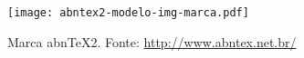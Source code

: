 \begin{frame}

\begin{figure}
  \centering
  \texttt{[image: abntex2-modelo-img-marca.pdf]}
  \caption{Marca abnTeX2. Fonte: \url{http://www.abntex.net.br/}}
\end{figure}

\end{frame}